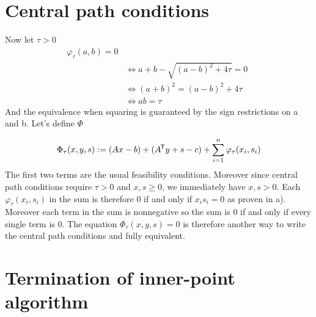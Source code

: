 \documentclass{article}
\newcommand*{\tran}{^{\mkern-1.5mu\mathsf{T}}}%
\begin{document}
	
	\clearpage
	
	
	\section{Central path conditions}
	Now let $\tau >0$
	\begin{align*}
		\varphi_\tau (a,b) = 0 \\
		&\iff a + b - \sqrt{(a-b)^2 + 4\tau } = 0\\
		&\iff (a+b)^2 = (a - b)^2 + 4\tau \quad \\
		&\iff ab = \tau
	\end{align*}
	And the equivalence when squaring is guaranteed by the sign restrictions on a and b. Let's define $\Phi$
	
	
	\begin{equation}
		\Phi _\tau (x,y,s) := (Ax-b) + (A\tran y + s - c) + \sum_{i=1}^{n}\varphi_\tau(x_i,s_i)
	\end{equation}
	The first two terms are the usual feasibility conditions. Moreover since central path conditions require $\tau >0$ and $x,s\geq 0$, we immediately have $x ,s >0$. Each $\varphi_\tau(x_i,s_i)$ in the sum is therefore 0 if and only if $x_i  s_i = 0$ as proven in a). Moreover each term in the sum is nonnegative so the sum is 0 if and only if every single term is 0. The equation $\Phi_\tau(x,y,s) = 0$ is therefore another way to write the central path conditions and fully equivalent. 
	
	\clearpage
	
	
	\section{Termination of inner-point algorithm}
	
\end{document}
